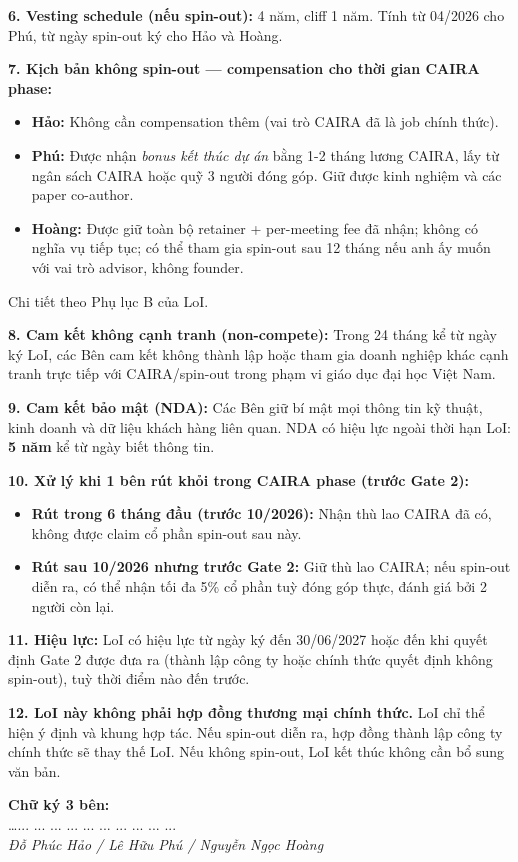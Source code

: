 \documentclass[11pt,a4paper]{article}
\begin{document}
\begin{tpl}[title=Letter of Intent --- Conditional Founder Agreement (template)]
\textbf{6. Vesting schedule (nếu spin-out):} 4 năm, cliff 1 năm. Tính từ 04/2026 cho Phú, từ ngày spin-out ký cho Hảo và Hoàng.

\textbf{7. Kịch bản không spin-out --- compensation cho thời gian CAIRA phase:}
\begin{itemize}
\item \textbf{Hảo:} Không cần compensation thêm (vai trò CAIRA đã là job chính thức).
\item \textbf{Phú:} Được nhận \textit{bonus kết thúc dự án} bằng 1-2 tháng lương CAIRA, lấy từ ngân sách CAIRA hoặc quỹ 3 người đóng góp. Giữ được kinh nghiệm và các paper co-author.
\item \textbf{Hoàng:} Được giữ toàn bộ retainer + per-meeting fee đã nhận; không có nghĩa vụ tiếp tục; có thể tham gia spin-out sau 12 tháng nếu anh ấy muốn với vai trò advisor, không founder.
\end{itemize}
Chi tiết theo Phụ lục B của LoI.

\textbf{8. Cam kết không cạnh tranh (non-compete):} Trong 24 tháng kể từ ngày ký LoI, các Bên cam kết không thành lập hoặc tham gia doanh nghiệp khác cạnh tranh trực tiếp với CAIRA/spin-out trong phạm vi giáo dục đại học Việt Nam.

\textbf{9. Cam kết bảo mật (NDA):} Các Bên giữ bí mật mọi thông tin kỹ thuật, kinh doanh và dữ liệu khách hàng liên quan. NDA có hiệu lực ngoài thời hạn LoI: \textbf{5 năm} kể từ ngày biết thông tin.

\textbf{10. Xử lý khi 1 bên rút khỏi trong CAIRA phase (trước Gate 2):}
\begin{itemize}
\item \textbf{Rút trong 6 tháng đầu (trước 10/2026):} Nhận thù lao CAIRA đã có, không được claim cổ phần spin-out sau này.
\item \textbf{Rút sau 10/2026 nhưng trước Gate 2:} Giữ thù lao CAIRA; nếu spin-out diễn ra, có thể nhận tối đa 5\% cổ phần tuỳ đóng góp thực, đánh giá bởi 2 người còn lại.
\end{itemize}

\textbf{11. Hiệu lực:} LoI có hiệu lực từ ngày ký đến 30/06/2027 hoặc đến khi quyết định Gate 2 được đưa ra (thành lập công ty hoặc chính thức quyết định không spin-out), tuỳ thời điểm nào đến trước.

\textbf{12. LoI này không phải hợp đồng thương mại chính thức.} LoI chỉ thể hiện
ý định và khung hợp tác. Nếu spin-out diễn ra, hợp đồng thành lập công ty chính
thức sẽ thay thế LoI. Nếu không spin-out, LoI kết thúc không cần bổ sung văn bản.

\textbf{Chữ ký 3 bên:}\\
\ldots ... ... ... ... ... ... ... ... ... ... \\
\textit{Đỗ Phúc Hảo / Lê Hữu Phú / Nguyễn Ngọc Hoàng}
\end{tpl}
\end{document}

